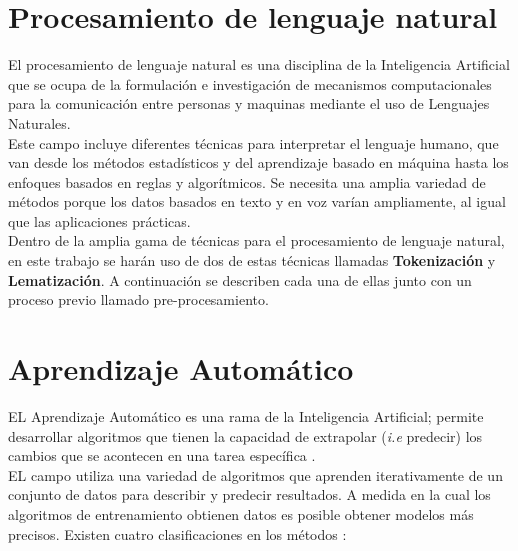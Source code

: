 
\section[Procesamiento de LN]{Procesamiento de lenguaje natural}

El procesamiento de lenguaje natural es una disciplina de la Inteligencia Artificial que se ocupa de la formulación e 
investigación de mecanismos computacionales para la comunicación entre personas y maquinas mediante el uso de Lenguajes 
Naturales.\\

Este campo incluye diferentes técnicas para interpretar el lenguaje humano, que van desde los métodos 
estadísticos y del aprendizaje basado en máquina hasta los enfoques basados en reglas y algorítmicos. Se necesita una amplia variedad 
de métodos porque los datos basados en texto y en voz varían ampliamente, al igual que las aplicaciones prácticas.\\

Dentro de la amplia gama de técnicas para el procesamiento de lenguaje natural, en este trabajo se harán uso de dos de estas técnicas llamadas \textbf{Tokenización} y \textbf{Lematización}. A continuación se describen cada una de ellas junto con un proceso previo llamado pre-procesamiento.\\


\section{Aprendizaje Automático}

EL Aprendizaje Automático es una rama de la Inteligencia Artificial; permite desarrollar algoritmos que tienen la capacidad de extrapolar (\textit{i.e} predecir) los cambios que se acontecen en una tarea específica \citep{CT2}.\\

EL campo utiliza una variedad de algoritmos que aprenden iterativamente de un conjunto de
datos para describir y predecir resultados. A medida en la cual los algoritmos de 
entrenamiento obtienen datos es posible obtener modelos más precisos. Existen cuatro clasificaciones en los métodos \citep{CT21}:

